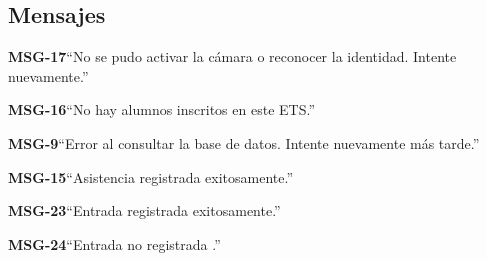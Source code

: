 \subsection{Mensajes}

\begin{Citemize}
    \item {\bf MSG-17}{``No se pudo activar la cámara o reconocer la identidad. Intente nuevamente.''}
    \item {\bf MSG-16}{``No hay alumnos inscritos en este ETS.''}
    \item {\bf MSG-9}{``Error al consultar la base de datos. Intente nuevamente más tarde.''}
    \item {\bf MSG-15}{``Asistencia registrada exitosamente.''}
    \item {\bf MSG-23}{``Entrada registrada exitosamente.''}
    \item {\bf MSG-24}{``Entrada no registrada .''}
\end{Citemize}
